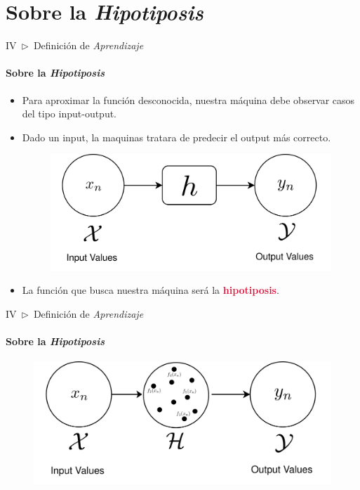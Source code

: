 \documentclass[xcolor=dvipsnames]{beamer}
\begin{document}
    \section{Sobre la \textit{Hipotiposis}}
    \begin{frame}{IV~$\rhd$~Definición de \textit{Aprendizaje}}
    \framesubtitle{Sobre la \textit{Hipotiposis}}
        \begin{itemize}
            \item Para aproximar la función desconocida, nuestra máquina debe observar casos del tipo input-output.
            \item Dado un input, la maquinas tratara de predecir el output más correcto.
            \begin{figure}
                \centering
                \includegraphics[width=0.8\linewidth]{imgs/def02/exp01.png}
            \end{figure}
            \item La función que busca nuestra máquina será la \textbf{\textcolor{crimson}{hipotiposis}}.
        \end{itemize}  
    \end{frame}

    \begin{frame}{IV~$\rhd$~Definición de \textit{Aprendizaje}}
    \framesubtitle{Sobre la \textit{Hipotiposis}}
        \begin{figure}
            \centering
            \includegraphics[width=\linewidth]{imgs/def02/exp02.png}
        \end{figure}
    \end{frame}
\end{document}
